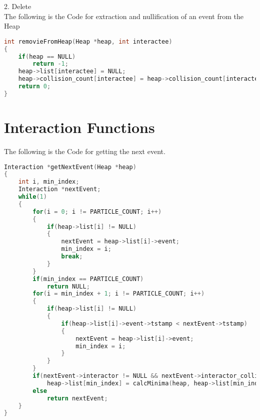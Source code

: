 \documentclass{article}
\begin{document}
2. Delete \\
The following is the Code for extraction and nullification of an event from the Heap
\begin{lstlisting}[language=c, caption=deleteFix]
int removieFromHeap(Heap *heap, int interactee)
{
    if(heap == NULL)
        return -1;
    heap->list[interactee] = NULL;
    heap->collision_count[interactee] = heap->collision_count[interactee] + 1;
    return 0;
}
\end{lstlisting}

\section{Interaction Functions}

The following is the Code for getting the next event.
\begin{lstlisting}[language=c, caption=process create]
Interaction *getNextEvent(Heap *heap)
{
    int i, min_index;
    Interaction *nextEvent;
    while(1)
    {
        for(i = 0; i != PARTICLE_COUNT; i++)
        {
            if(heap->list[i] != NULL)
            {
                nextEvent = heap->list[i]->event;
                min_index = i;
                break;
            }
        }
        if(min_index == PARTICLE_COUNT)
            return NULL;
        for(i = min_index + 1; i != PARTICLE_COUNT; i++)
        {
            if(heap->list[i] != NULL)
            {
                if(heap->list[i]->event->tstamp < nextEvent->tstamp)
                {
                    nextEvent = heap->list[i]->event;
                    min_index = i;
                }
            }
        }
        if(nextEvent->interactor != NULL && nextEvent->interactor_collision_count != heap->collision_count[nextEvent->interactor->id])
            heap->list[min_index] = calcMinima(heap, heap->list[min_index]);
        else
            return nextEvent;
    }
}
\end{lstlisting}
\end{document}

